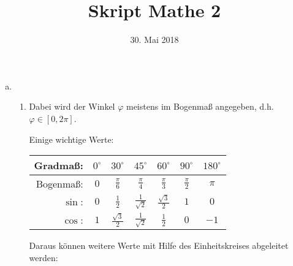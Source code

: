\documentclass[10pt, a4paper, fleqn]{article}
\begin{document}
    \title{Skript Mathe 2}
    \date{30. Mai 2018}
    \maketitle
\fi
    \begin{enumerate}[a), start=9]
        \item[]
        \begin{enumerate}[1.]
            \item Dabei wird der Winkel $\varphi$ meistens im Bogenmaß
            angegeben, d.h. $\varphi \in [0, 2 \pi]$. 
            
            Einige wichtige Werte:

            {\def\arraystretch{1.5}             
            \begin{tabular}{|r|c|c|c|c|c|c|}
                \hline
                Gradmaß: & $0^\circ$ & $30^\circ$ & $45^\circ$ & $60^\circ$ & $90^\circ$ & $180^\circ$ \\
                \hline
                Bogenmaß: & $0$ & $\frac{\pi}{6}$ & $\frac{\pi}{4}$ & $\frac{\pi}{3}$ & $\frac{\pi}{2}$ & $\pi$ \\
                \hline
                $\sin$: & $0$ & $\frac{1}{2}$ & $\frac{1}{\sqrt{2}}$ & $\frac{\sqrt{3}}{2}$ & $1$ & $0$ \\
                \hline
                $\cos$: & $1$ & $\frac{\sqrt{3}}{2}$ & $\frac{1}{\sqrt{2}}$ & $\frac{1}{2}$ & $0$ & $-1$ \\
                \hline
            \end{tabular}}

            Daraus können weitere Werte mit Hilfe des Einheitskreises abgeleitet werden:
            
            \begin{minipage}{0.6\textwidth}
\end{minipage}
\end{enumerate}
\end{enumerate}
\end{document}
